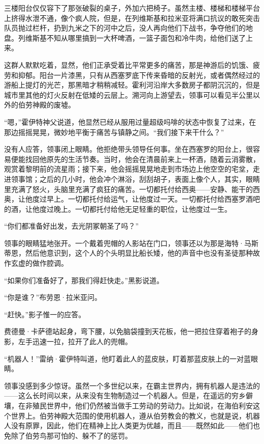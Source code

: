 \documentclass[AutoFakeBold=true]{book}
\begin{document}
\vspace*{1em}

三楼阳台仅仅容下了那张破裂的桌子，外加六把椅子。虽然主楼、楼梯和楼梯平台上挤得水泄不通，像个疯人院，但是，在列维斯基和拉米亚将满口抗议的敢死突击队员抛过栏杆，扔到九米之下的河中之后，没人再向他们下战书，争夺他们的地盘。列维斯基不知从哪里搞到一大杯啤酒，一篮子面包和冷牛肉，给他们送了上来。

这群人默默吃着，显然，他们正承受着比平常更多的痛苦，那是神游后的饥饿、疲劳和抑郁。阳台一片漆黑，只有从西塞罗底下传来昏暗的反射光，或者偶然经过的游船上提灯的光芒，那黑暗才稍稍减轻。霍利河沿岸大多数房子都阴沉沉的，但是城市里其他的灯火反射在低矮的云层上。溯河向上游望去，领事可以看见半公里以外的伯劳神殿的废墟。

``嗯，''霍伊特神父说道，他显然已经从服用过量超级吗啡的状态中恢复了过来，在那边摇摇晃晃，微妙地平衡于痛苦与镇静之间。``我们接下来干什么？''

没有人应答，领事闭上眼睛。他拒绝带头领导任何事。坐在西塞罗的阳台上，很容易便能找回他原先的生活节奏。当时，他会在清晨前来上一杯酒，随着云消雾散，观赏着黎明前的流星雨；接下来，他会摇摇晃晃地走到市场边上他空空的宅坌，走进领事馆；之后的几小时，他会冲个淋浴，刮刮胡子，表面上像个人，其实，眼睛里充满了怒火，头脑里充满了疯狂的痛苦。一切都托付给西奥——安静、能干的西奥，让他度过早上。一切都托付给运气，让他度过一天。一切都托付给西塞罗酒吧的酒，让他度过晚上。一切都托付给他无足轻重的职位，让他度过一生。

``你们都准备好出发，去光阴冢朝圣了吗？''

领事的眼睛猛地张开。一个戴着兜帽的人影站在门口，领事还以为那是海特·马斯蒂恩，然后他意识到，这个人的个头明显比船长矮，他的声音中也没有圣徒那种故作玄虚的做作腔调。

``如果你们准备好了，那我们得赶快走。''黑影说道。

``你是谁？''布劳恩·拉米亚问。

``赶快。''影子惟一的应答。

费德曼·卡萨德站起身，弯下腰，以免脑袋撞到天花板，他一把拉住穿着袍子的身影，左手迅速一拉，拉开了此人的兜帽。

``机器人！''雷纳·霍伊特叫道，他盯着此人的蓝皮肤，盯着那蓝皮肤上的一对蓝眼睛。

领事没感到多少惊讶。虽然一个多世纪以来，在霸主世界内，拥有机器人是违法的——这么长时间以来，从来没有生物制造过一个机器人。但是，在遥远的穷乡僻壤，在非殖民世界中，他们仍然被当做手工劳动的劳动力。比如说，在海伯利安这个世界上。伯劳神殿大范围的使用机器人，遵从伯劳教会的教义，也就是说，机器人没有原罪，因此，他们在精神上比人类更为优越，而且——既然如此——他们也免除了伯劳鸟那可怕的、躲不了的惩罚。
\end{document}
